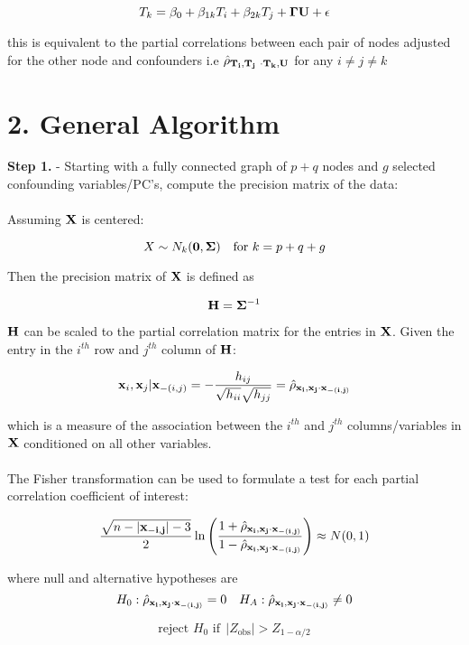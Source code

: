 \documentclass[12pt]{report}
\begin{document}
\[ T_k = \beta_0 + \beta_{1k}T_i + \beta_{2k}T_j+ {\bf \Gamma U} +\epsilon \]

this is equivalent to the partial correlations between each pair of nodes adjusted for the other node and confounders i.e  $\hat{\rho}_{\bf T_i,T_j \ \cdot T_k, {\bf U}  }$ for any $ i\neq j\neq k$ 



\section*{2. General Algorithm}

\textbf{Step 1.} - Starting with a fully connected graph of $p+q$ nodes and $g$ selected confounding variables/PC's, compute the precision matrix of the data: \\
\\
Assuming $\bf X$ is centered:

\[ X \sim N_k({\bf 0}, {\bf\Sigma})  \ \ \ \text{for} \ k=p+q+g\]
 
Then the precision matrix of $\bf X$ is defined as 

\[  {\bf H} = {\bf \Sigma}^{-1} \]

$\bf H$ can be scaled to the partial correlation matrix for the entries in $\bf X$. Given the entry in the $i^{th}$ row and $j^{th}$ column of $\bf H$:

\[  {\bf x}_i, {\bf x}_j | {\bf x}_{-(i,j)} = - \frac{h_{ij}}{\sqrt{h_{ii}}\sqrt{h_{jj}}} = \hat{\rho}_{\bf x_i,x_j\cdot x_{ -(i,j)}  }\]

which is a measure of the association between the $i^{th}$ and $j^{th}$ columns/variables in $\bf X$ conditioned on all other variables. \\
\\
The Fisher transformation can be used to formulate a test for each partial correlation coefficient of interest:

\[ \frac{\sqrt{n - |{\bf x_{-i,j}}| -3}}{2}\ln\left( \frac{1+\hat{\rho}_{\bf x_i,x_j\cdot x_{ -(i,j)}  }}{1-\hat{\rho}_{\bf x_i,x_j\cdot x_{ -(i,j)}  }} \right)  \approx N(0,1)\]

where null and alternative hypotheses are 
\[ H_0:  \hat{\rho}_{\bf x_i,x_j\cdot x_{ -(i,j)}  } = 0 \ \ \ H_A: \hat{\rho}_{\bf x_i,x_j\cdot x_{ -(i,j)}  }\neq 0\]

\[  \text{reject $H_0$ if} \ \  | Z_{\text{obs}}| > Z_{1-\alpha/2 }\]
\end{document}
